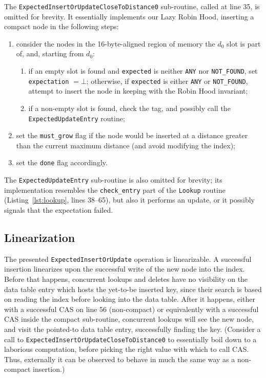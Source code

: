 The \texttt{ExpectedInsertOrUpdateCloseToDistance0} sub-routine, called at line 35, is omitted for brevity.
It essentially implements our Lazy Robin Hood, inserting a compact node in the following steps:
\begin{enumerate}
    \item consider the nodes in the 16-byte-aligned region of memory the $d_0$ slot is part of, and, starting from $d_0$:
    \begin{enumerate}
        \item if an empty slot is found and \texttt{expected} is neither \texttt{ANY} nor \texttt{{NOT\_FOUND}}, set \texttt{expectation} $=\bot$; otherwise, if \texttt{expected} is either \texttt{ANY} or \texttt{{NOT\_FOUND}}, attempt to insert the node in keeping with the Robin Hood invariant;
        \item if a non-empty slot is found, check the tag, and possibly call the \texttt{ExpectedUpdateEntry} routine;
    \end{enumerate}
    \item set the \texttt{{must\_grow}} flag if the node would be inserted at a distance greater than the current maximum distance (and avoid modifying the index);
    \item set the \texttt{done} flag accordingly.
\end{enumerate}

The \texttt{ExpectedUpdateEntry} sub-routine is also omitted for brevity; its implementation resembles the \texttt{{check\_entry}} part of the \texttt{Lookup} routine (Listing~\ref{lst:lookup}, lines 38--65), but also it performs an update, or it possibly signals that the expectation failed.

\subsection{Linearization}\label{subsec:insert-linearization}

The presented \texttt{ExpectedInsertOrUpdate} operation is linearizable.
A successful insertion linearizes upon the successful write of the new node into the index.
Before that happens, concurrent lookups and deletes have no visibility on the data table entry which hosts the yet-to-be inserted key, since their search is based on reading the index before looking into the data table.
After it happens, either with a successful CAS on line 56 (non-compact) or equivalently with a successful CAS inside the compact sub-routine, concurrent lookups will see the new node, and visit the pointed-to data table entry, successfully finding the key.
(Consider a call to \texttt{ExpectedInsertOrUpdateCloseToDistance0} to essentially boil down to a laborious computation, before picking the right value with which to call CAS\@.
Thus, externally it can be observed to behave in much the same way as a non-compact insertion.)

